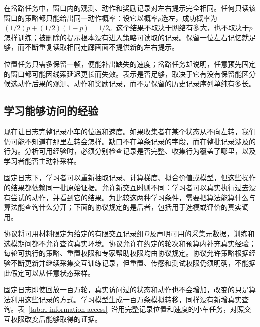 在岔路任务中，窗口内的观测、动作和奖励记录对左右提示完全相同。任何只读该窗口的策略都只能给出同一动作概率：设它以概率$p$选左，成功概率为$(1/2)p+(1/2)(1-p)=1/2$。这个结果不取决于网络有多大，也不取决于$p$怎样训练；被删除的提示根本没有进入策略可读取的记录。保留一位左右记忆就足够，而不断重复读取相同走廊画面不提供新的左右提示。

位置任务只需多保留一帧，便能补出缺失的速度；岔路任务却说明，任意预先固定的窗口都可能因线索延迟更长而失效。表示是否足够，取决于它有没有保留能区分候选动作后果的观测、动作和奖励记录，而不是保留的历史记录序列单纯有多长。

\subsection{学习能够访问的经验}
\label{sec:rl-information-data-access}

现在让日志完整记录小车的位置和速度。如果收集者在某个状态从不向左转，我们仍可能不知道在那里左转会怎样。缺口不在单条记录的字段，而在整批记录涉及的行为。分析可用经验时，必须分别检查记录是否完整、收集行为覆盖了哪里，以及学习者能否主动补采样。

固定日志下，学习者可以重新抽取记录、计算梯度、拟合价值或模型，但这些操作的结果都依赖同一批原始证据。允许新交互时则不同：学习者可以真实执行过去没有尝试的动作，并看到它的结果。为比较这两种学习条件，需要把算法能算什么与算法能查询什么分开；下面的协议规定的是后者，包括用于选模或评价的真实调用。

\begin{definition}[经验访问协议]
  \label{def:rl-information-access}
  协议将可用材料限定为给定的有限交互记录组$D$及声明可用的采集元数据，训练和选模期间都不允许查询真实环境。协议允许在约定的轮次和预算内补充真实经验；每轮可执行的策略、重置权限和专家帮助权限均由协议规定。协议允许策略根据经验不断更新并继续采集交互训练记录，但重置、传感和测试权限仍须明确，不能据此假定可以从任意状态采样。
\end{definition}

固定日志即使回放一百万轮，真实访问过的状态和动作也不会增加，改变的只是算法利用这些记录的方式。学习模型生成一百万条模拟转移，同样没有新增真实查询。表~\ref{tab:rl-information-access}~沿用完整记录位置和速度的小车任务，对照交互权限改变后能够取得的证据。

